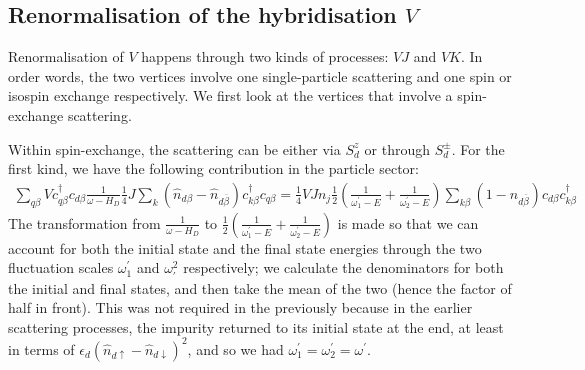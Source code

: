 \subsection{Renormalisation of the hybridisation \(V\)}
Renormalisation of \(V\) happens through two kinds of processes: \(VJ\) and \(VK\). In order words, the two vertices involve one single-particle scattering and one spin or isospin exchange respectively. We first look at the vertices that involve a spin-exchange scattering.

Within spin-exchange, the scattering can be either via \(S_d^z\) or through \(S_d^\pm\). For the first kind, we have the following contribution in the particle sector:
\begin{equation}\begin{aligned}
	\sum_{q\beta} Vc^\dagger_{q\beta} c_{d\beta} \frac{1}{\omega - H_D}\frac{1}{4}J \sum_{k} \left(\hat n_{d\beta} - \hat n_{d\overline\beta}\right) c^\dagger_{k\beta}c_{q\beta} = \frac{1}{4}V J n_j \frac{1}{2}\left(\frac{1}{\omega^\prime_1 - E} + \frac{1}{\omega^\prime_2 - E}\right)\sum_{k\beta} \left(1 - \hat n_{d\overline\beta}\right) c_{d\beta}c^\dagger_{k\beta}
\end{aligned}\end{equation}
The transformation from \(\frac{1}{\omega - H_D}\) to \(\frac{1}{2}\left(\frac{1}{\omega^\prime_1 - E} + \frac{1}{\omega^\prime_2 - E}\right)\) is made so that we can account for both the initial state and the final state energies through the two fluctuation scales \(\omega^\prime_1\) and \(\omega^2_\prime\) respectively; we calculate the denominators for both the initial and final states, and then take the mean of the two (hence the factor of half in front). This was not required in the previously because in the earlier scattering processes, the impurity returned to its initial state at the end, at least in terms of \(\epsilon_d \left( \hat n_{d \uparrow} - \hat n_{d \downarrow} \right)^2 \), and so we had \(\omega_1^\prime = \omega_2^\prime = \omega^\prime\).


